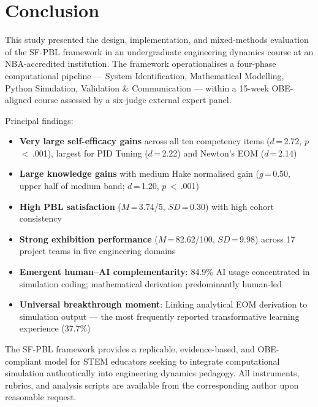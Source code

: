 \documentclass[12pt, a4paper]{article}
\begin{document}
\section{Conclusion}

This study presented the design, implementation, and mixed-methods
evaluation of the SF-PBL framework in an undergraduate engineering
dynamics course at an NBA-accredited institution. The framework
operationalises a four-phase computational pipeline --- System
Identification, Mathematical Modelling, Python Simulation,
Validation \& Communication --- within a 15-week OBE-aligned
course assessed by a six-judge external expert panel.

Principal findings:
\begin{itemize}[noitemsep]
  \item \textbf{Very large self-efficacy gains} across all ten
    competency items ($d$\,=\,2.72, $p$\,$<$\,.001), largest for
    PID Tuning ($d$\,=\,2.22) and Newton's EOM ($d$\,=\,2.14)

  \item \textbf{Large knowledge gains} with medium Hake normalised
    gain ($g$\,=\,0.50, upper half of medium band; $d$\,=\,1.20,
    $p$\,$<$\,.001)

  \item \textbf{High PBL satisfaction} ($M$\,=\,3.74/5,
    $SD$\,=\,0.30) with high cohort consistency

  \item \textbf{Strong exhibition performance}
    ($M$\,=\,82.62/100, $SD$\,=\,9.98) across 17 project teams
    in five engineering domains

  \item \textbf{Emergent human--AI complementarity}: 84.9\% AI
    usage concentrated in simulation coding; mathematical
    derivation predominantly human-led

  \item \textbf{Universal breakthrough moment}: Linking analytical
    EOM derivation to simulation output --- the most frequently
    reported transformative learning experience (37.7\%)
\end{itemize}

The SF-PBL framework provides a replicable, evidence-based, and
OBE-compliant model for STEM educators seeking to integrate
computational simulation authentically into engineering dynamics
pedagogy. All instruments, rubrics, and analysis scripts are
available from the corresponding author upon reasonable request.
\end{document}
